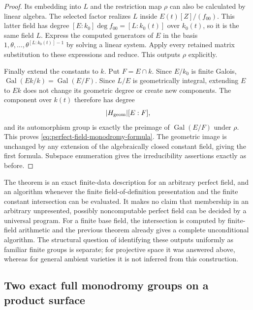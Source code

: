 \begin{proof}
Its embedding into $L$ and the restriction map
$\rho$ can also be calculated by linear algebra.
The selected factor realizes $L$ inside
$E(t)[Z]/(f_{00})$.
This latter field has degree
$[E:k_0]\deg f_{00}=[L:k_0(t)]$ over $k_0(t)$,
so it is the same field $L$.
Express the computed generators of $E$ in the
basis $1,\theta,\ldots,\theta^{[L:k_0(t)]-1}$
by solving a linear system.  Apply every retained
matrix substitution to these expressions and
reduce.  This outputs $\rho$ explicitly.

Finally extend the constants to $k$.
Put $F=E\cap k$.  Since $E/k_0$ is finite Galois,
$\operatorname{Gal}(Ek/k)=\operatorname{Gal}(E/F)$.
Since $L/E$ is geometrically integral, extending
$E$ to $Ek$ does not change its geometric degree
or create new components.  The component over
$k(t)$ therefore has degree
\[
 |H_{\rm geom}|[E:F],
\]
and its automorphism group is exactly the preimage
of $\operatorname{Gal}(E/F)$ under $\rho$.
This proves \eqref{eq:perfect-field-monodromy-formula}.
The geometric image is unchanged by any extension
of the algebraically closed constant field, giving
the first formula.  Subspace enumeration gives the
irreducibility assertions exactly as before.
\end{proof}

\begin{remark}\label{rem:perfect-field-data-scope}
The theorem is an exact finite-data description for
an arbitrary perfect field, and an algorithm whenever
the finite field-of-definition presentation and the
finite constant intersection can be evaluated.
It makes no claim that membership in an arbitrary
unpresented, possibly noncomputable perfect field
can be decided by a universal program.
For a finite base field, the intersection is computed
by finite-field arithmetic and the previous theorem
already gives a complete unconditional algorithm.
The structural question of identifying these outputs
uniformly as familiar finite groups is separate;
for projective space it was answered above, whereas
for general ambient varieties it is not inferred
from this construction.
\end{remark}


\subsection{Two exact full monodromy groups on a product surface}
\label{subsec:product-full-groups}

